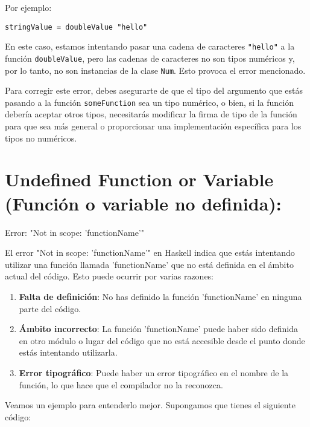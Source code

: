 \documentclass{article}
\begin{document}
Por ejemplo:

\begin{verbatim}
stringValue = doubleValue "hello"
\end{verbatim}

En este caso, estamos intentando pasar una cadena de caracteres \texttt{"hello"} a la función \texttt{doubleValue}, pero las cadenas de caracteres no son tipos numéricos y, por lo tanto, no son instancias de la clase \texttt{Num}. Esto provoca el error mencionado.

Para corregir este error, debes asegurarte de que el tipo del argumento que estás pasando a la función \texttt{someFunction} sea un tipo numérico, o bien, si la función debería aceptar otros tipos, necesitarás modificar la firma de tipo de la función para que sea más general o proporcionar una implementación específica para los tipos no numéricos.

\newpage
\section{Undefined Function or Variable (Función o variable no definida):}

\begin{mdframed}[backgroundcolor=red!40,shadow=true,shadowsize=2pt,roundcorner=2pt]
    Error: "Not in scope: 'functionName'"
\end{mdframed}

El error "Not in scope: 'functionName'" en Haskell indica que estás intentando utilizar una función llamada 'functionName' que no está definida en el ámbito actual del código. Esto puede ocurrir por varias razones:

\begin{enumerate}
    \item \textbf{Falta de definición}: No has definido la función 'functionName' en ninguna parte del código.
    
    \item \textbf{Ámbito incorrecto}: La función 'functionName' puede haber sido definida en otro módulo o lugar del código que no está accesible desde el punto donde estás intentando utilizarla.
    
    \item \textbf{Error tipográfico}: Puede haber un error tipográfico en el nombre de la función, lo que hace que el compilador no la reconozca.
\end{enumerate}

Veamos un ejemplo para entenderlo mejor. Supongamos que tienes el siguiente código:
\end{document}
